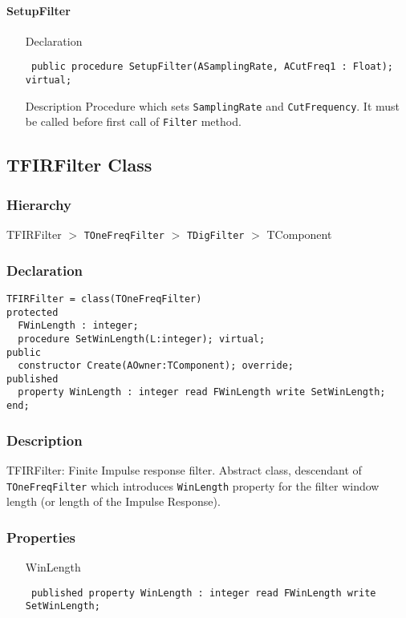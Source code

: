 \documentclass[12pt,a4paper,oneside]{report}
\newcommand{\declarationitem}[1]{{\addfontfeatures{FakeBold=1.3} #1}}
\newcommand{\descriptiontitle}[1]{{\addfontfeatures{FakeSlant}#1}}
\newcommand{\code}[1]{\texttt{#1}}
\begin{document}
\paragraph{SetupFilter}\hspace*{\fill}
\label{lmfilters.TOneFreqFilter-SetupFilter}
\begin{itemize}\item[\declarationitem{Declaration}\hfill]
	\begin{flushleft}
		\code{
			public procedure SetupFilter(ASamplingRate, ACutFreq1 : Float); virtual;}
	\end{flushleft}
	\item[\descriptiontitle{Description}] Procedure which sets \code{SamplingRate} and \code{CutFrequency}. It must be called before first call of \code{Filter} method.	
\end{itemize}
\subsection{TFIRFilter Class}
\label{lmfilters.TFIRFilter}
\subsubsection{Hierarchy}
TFIRFilter {$>$} \code{TOneFreqFilter} {$>$} \code{TDigFilter} {$>$} 
TComponent
\subsubsection{Declaration}
\begin{verbatim}
TFIRFilter = class(TOneFreqFilter)
protected
  FWinLength : integer;
  procedure SetWinLength(L:integer); virtual;
public
  constructor Create(AOwner:TComponent); override;
published
  property WinLength : integer read FWinLength write SetWinLength;
end;
\end{verbatim}
\subsubsection{Description}
TFIRFilter: Finite Impulse response filter. Abstract class, descendant of \code{TOneFreqFilter} which introduces \code{WinLength} property for the filter window length (or length of the Impulse Response). 
\subsubsection{Properties}
\begin{itemize}\label{lmfilters.TFIRFilter-WinLength}
	\item[\declarationitem{WinLength}\hfill]
	\begin{flushleft}
		\code{
			published property WinLength : integer read FWinLength write SetWinLength;}
	\end{flushleft}
  \end{itemize}
\end{document}
